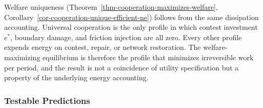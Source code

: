 \documentclass[11pt]{article}
\theoremstyle{plain}
\theoremstyle{definition}
\theoremstyle{remark}
\let\origsubsubsection\subsubsection
\renewcommand{\subsubsection}{\needspace{4\baselineskip}\origsubsubsection}
\begin{document}
Welfare uniqueness (Theorem~\ref{thm-cooperation-maximizes-welfare},
Corollary~\ref{cor-cooperation-unique-efficient-ne}) follows from the
same dissipation accounting. Universal cooperation is the only profile
in which contest investment \(e^*\), boundary damage, and friction
injection are all zero. Every other profile expends energy on contest,
repair, or network restoration. The welfare-maximizing equilibrium is
therefore the profile that minimizes irreversible work per period, and
the result is not a coincidence of utility specification but a property
of the underlying energy accounting.

\subsubsection{Testable Predictions}\label{testable-predictions-4}
\end{document}
